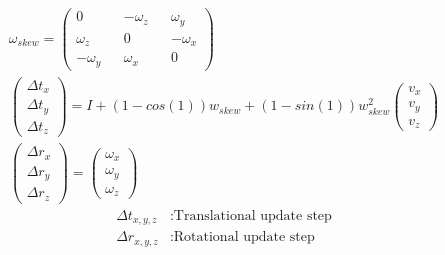 \documentclass[11pt,a4paper,titlepage,oneside]{report}
\begin{document}
\begin{equation}\label{eq:pe_closed_form}
  \begin{gathered}
    \omega_{skew}=\begin{pmatrix}
      0 && -\omega_z && \omega_y \\
      \omega_z && 0 && -\omega_x \\
      -\omega_y && \omega_x && 0
    \end{pmatrix}\\
    \begin{pmatrix}
      \Delta t_x\\
      \Delta t_y\\
      \Delta t_z
    \end{pmatrix}=
    I+(1-cos(1))w_{skew}+(1-sin(1)) w_{skew}^2 \begin{pmatrix}
      v_x\\
      v_y\\
      v_z
    \end{pmatrix}\\
    \begin{pmatrix}
      \Delta r_x\\
      \Delta r_y\\
      \Delta r_z
    \end{pmatrix}=
    \begin{pmatrix}
      \omega_x\\
      \omega_y\\
      \omega_z
    \end{pmatrix}
  \end{gathered}
\end{equation}
\begin{align*}
  \Delta t_{x,y,z}    &: \text{Translational update step}\\
  \Delta r_{x,y,z}    &: \text{Rotational update step}
\end{align*}
\end{document}
